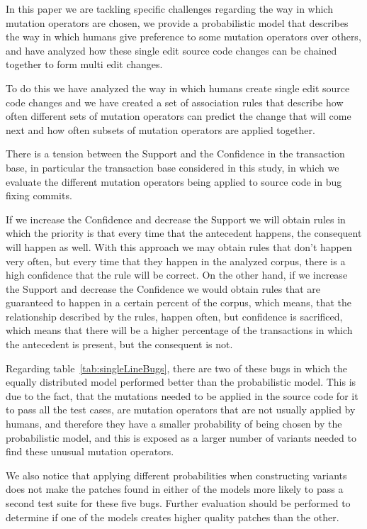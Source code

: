 \documentclass[conference]{IEEEtran}
\begin{document}
In this paper we are tackling specific 
challenges regarding the way in which mutation operators are chosen, we provide 
a probabilistic model that describes the way in which humans give preference to 
some mutation operators over others, and have analyzed how these single edit 
source code changes can be chained together to form multi edit changes.

To do this we have analyzed the way in which humans create single edit 
source code changes and we have created a set of association rules that describe 
how often different sets of mutation operators can predict the change that will 
come next and how often subsets of mutation operators are applied together.

There is a tension between the Support and the Confidence in the transaction 
base, in particular the transaction base considered in this study, in which we 
evaluate the different mutation operators being applied to source code in bug 
fixing commits. 

If we increase the Confidence and decrease the Support we will obtain rules in 
which the priority is that every time that the antecedent happens, the 
consequent will happen as well. With this approach we may obtain rules that 
don't happen very often, but every time that they happen in the analyzed corpus, 
there is a high confidence that the rule will be correct. On the other hand, if 
we increase the Support and decrease the Confidence we would obtain rules that 
are guaranteed to happen in a certain percent of the corpus, which means, that 
the relationship described by the rules, happen often, but confidence is 
sacrificed, which means that there will be a higher percentage of the 
transactions in which the antecedent is present, but the consequent is not. 

Regarding table~\ref{tab:singleLineBugs}, there are two of these bugs in which
the equally distributed model performed better than the probabilistic
model. This is due to the fact, that the mutations needed to be applied in the
source code for it to pass all the test cases, are mutation operators that are
not usually applied by humans, and therefore they have a smaller probability of
being chosen by the probabilistic model, and this is exposed as a larger number
of variants needed to find these unusual mutation operators. 

We also notice that applying different probabilities when constructing variants
does not make the patches found in either of the models more likely to pass a
second test suite for these five bugs. Further evaluation should be performed to
determine if one of the models creates higher quality patches than the other. 
  
\end{document}
